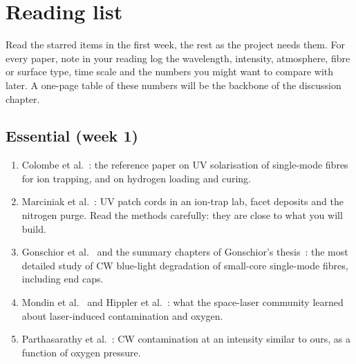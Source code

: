 \section{Reading list}\label{sec:reading}
Read the starred items in the first week, the rest as the project needs them. For every paper, note in
your reading log the wavelength, intensity, atmosphere, fibre or surface type, time scale and the
numbers you might want to compare with later. A one-page table of these numbers will be the backbone
of the discussion chapter.

\subsection*{Essential (week 1)}
\begin{enumerate}[label=$\bigstar$,leftmargin=1.6em]
  \item Colombe et al.~\cite{Colombe2014}: the reference paper on UV solarisation of single-mode
        fibres for ion trapping, and on hydrogen loading and curing.
  \item Marciniak et al.~\cite{Marciniak2017}: UV patch cords in an ion-trap lab, facet deposits and
        the nitrogen purge. Read the methods carefully: they are close to what you will build.
  \item Gonschior et al.~\cite{Gonschior2013JNCS} and the summary chapters of Gonschior's
        thesis~\cite{Gonschior2013PhD}: the most detailed study of CW blue-light degradation of
        small-core single-mode fibres, including end caps.
  \item Mondin et al.~\cite{Mondin2017} and Hippler et al.~\cite{Hippler2016}: what the space-laser
        community learned about laser-induced contamination and oxygen.
  \item Parthasarathy et al.~\cite{Parthasarathy2024}: CW contamination at an intensity similar to
        ours, as a function of oxygen pressure.
\end{enumerate}

